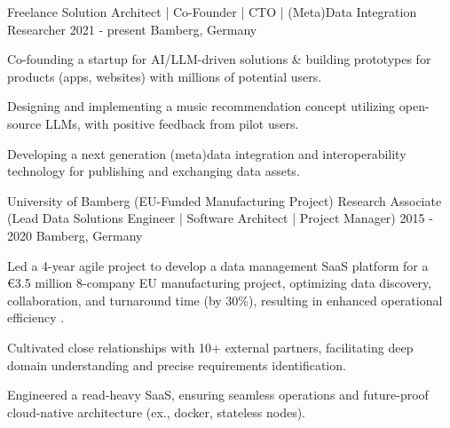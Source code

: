 {}


\begin{cventries}




    
        
  \cventry
    {Freelance} %
    {Solution Architect | Co-Founder | CTO | (Meta)Data Integration Researcher}
    {2021 - present} %
    {Bamberg, Germany} %
    {
      \begin{cvitems} %
		\item {Co-founding a startup for AI/LLM-driven solutions \& building prototypes for products (apps, websites) with millions of potential users.}
		\item {Designing and implementing a music recommendation concept utilizing open-source LLMs, with positive feedback from pilot users.}
		\item {Developing a next generation (meta)data integration and interoperability technology for publishing and exchanging data assets.}
    \end{cvitems}
    }
    



    
        
  \cventry
    {University of Bamberg (EU-Funded Manufacturing Project)} %
    {Research Associate (Lead Data Solutions Engineer | Software Architect | Project Manager)}
    {2015 - 2020} %
    {Bamberg, Germany} %
    {
      \begin{cvitems} %
		\item {Led a 4-year agile project to develop a data management SaaS platform for a €3.5 million 8-company EU manufacturing project, optimizing data discovery, collaboration, and turnaround time (by 30\%), resulting in enhanced operational efficiency .}
		\item {Cultivated close relationships with 10+ external partners, facilitating deep domain understanding and precise requirements identification.}
		\item {Engineered a read-heavy SaaS, ensuring seamless operations and future-proof cloud-native architecture (ex., docker, stateless nodes).}
      \end{cvitems}
    }


\end{cventries}
